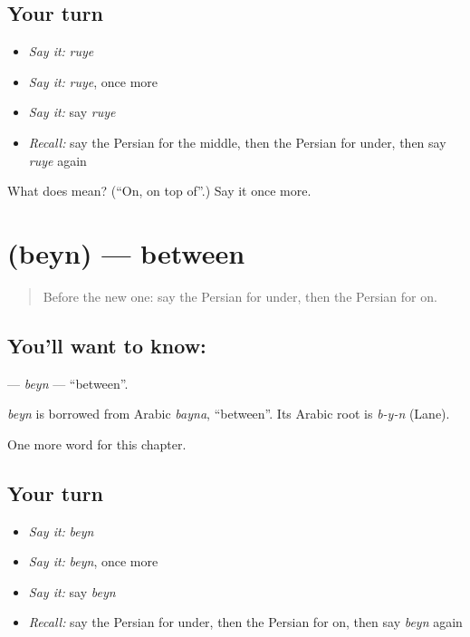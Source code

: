\subsection*{Your turn}
\begin{itemize}
\raggedright
  \item \emph{Say it:} \emph{ruye}
  \item \emph{Say it:} \emph{ruye}, once more
  \item \emph{Say it:} say \emph{ruye}
  \item \emph{Recall:} say the Persian for the middle, then the Persian for under, then say \emph{ruye} again
\end{itemize}

\begin{tcolorbox}[breakable,colback=teal!4,colframe=teal!35!black,title={Before you move on}]
What does  mean? (\textquotedblleft{}On, on top of\textquotedblright{}.) Say it once more.
\end{tcolorbox}
\section[\texorpdfstring{\fa{بین} (beyn)}{بین (beyn)}]{ (beyn) — between}

\label{lesson:FA-C86-beyn}



\begin{quote}
Before the new one: say the Persian for under, then the Persian for on.
\end{quote}

\subsection*{You'll want to know: }
\textbf{} — \emph{beyn} — \textquotedblleft{}between\textquotedblright{}.

\begin{cousinweb}
\emph{beyn} is borrowed from Arabic \emph{bayna}, \textquotedblleft{}between\textquotedblright{}. Its Arabic root is \emph{b-y-n} (Lane).
\end{cousinweb}

\begin{grammarlens}[title={What you've built}]
One more word for this chapter.
\end{grammarlens}

\subsection*{Your turn}
\begin{itemize}
\raggedright
  \item \emph{Say it:} \emph{beyn}
  \item \emph{Say it:} \emph{beyn}, once more
  \item \emph{Say it:} say \emph{beyn}
  \item \emph{Recall:} say the Persian for under, then the Persian for on, then say \emph{beyn} again
\end{itemize}

